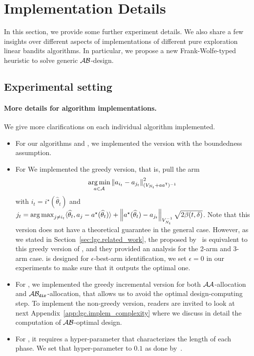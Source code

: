 \section{Implementation Details}\label{app:lgc.implem}

In this section, we provide some further experiment details. We also share a few insights over different aspects of implementations of different pure exploration linear bandits algorithms. In particular, we propose a new Frank-Wolfe-typed heuristic to solve generic $\mathcal{A}\mathcal{B}$-design.

\subsection{Experimental setting}

\paragraph{More details for algorithm implementations.} We give more clarifications on each individual algorithm implemented.

\begin{itemize}
	\item For our algorithms \LG and \LGC, we implemented the version with the boundedness assumption.
	\item For \LGapE We implemented the greedy version, that is, pull the arm 
	\[
	    \operatorname*{arg\,min}_{a\in\mathcal{A}} \left\lVert a_{i_t}-a_{j_t}\right\rVert_{(V_{N_t}+aa^{\mathsf{\scriptscriptstyle T}})^{-1}}^2
	\]
	with $i_t = i^\star(\hat\theta_t)$ and $j_t = \operatorname*{arg\,max}_{j\neq i_t}\langle\widehat\theta_t,a_{j}-a^\star(\widehat\theta_t)\rangle + \left\lVert a^\star(\widehat\theta_t) - a_{j_t}\right\rVert_{V_{N_t}^{-1}} \sqrt{2\beta(t,\delta)}$. Note that this version does not have a theoretical guarantee in the general case. However, as we stated in Section~\ref{sec:lgc.related_work}, the \GLUCB proposed by~\citet{zaki2019maxoverlap} is equivalent to this greedy version of \LGapE, and they provided an analysis for the 2-arm and 3-arm case. \LGapE is designed for $\epsilon$-best-arm identification, we set $\epsilon=0$ in our experiments to make sure that it outputs the optimal one.
	\item For \XYS, we implemented the greedy incremental version for both $\mathcal{A}\mathcal{A}$-allocation and $\mathcal{A}\mathcal{B}_{\texttt{dir}}$-allocation, that allows us to avoid the optimal design-computing step. To implement the non-greedy version, readers are invited to look at next Appendix~\ref{app:lgc.implem_complexity} where we discuss in detail the computation of $\mathcal{A}\mathcal{B}$-optimal design.
	\item For \XYA, it requires a hyper-parameter that characterizes the length of each phase. We set that hyper-parameter to $0.1$ as done by~\citet{soare2014linear}.
\end{itemize}

